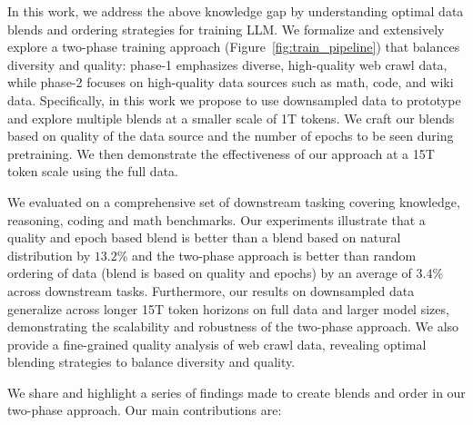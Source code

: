 \documentclass[11pt]{article}
\newcommand{\gainRO}{$3.4$\%\xspace}
\newcommand{\gainROND}{$13.2$\%\xspace}
\begin{document}
In this work, we address the above knowledge gap by understanding optimal data blends and ordering strategies for training LLM. We formalize and extensively explore a two-phase training approach (Figure~\ref{fig:train_pipeline}) that balances diversity and quality: phase-1 emphasizes diverse, high-quality web crawl data, while phase-2 focuses on high-quality data sources such as math, code, and wiki data.
Specifically, in this work we propose to use downsampled data to prototype and explore multiple blends at a smaller scale of 1T tokens.
We craft our blends based on quality of the data source and the number of epochs to be seen during pretraining.
We then demonstrate the effectiveness of our approach at a 15T token scale using the full data.

We evaluated on a comprehensive set of downstream tasking covering knowledge, reasoning, coding and math benchmarks.
Our experiments illustrate that a quality and epoch based blend is better than a blend based on natural distribution by \gainROND and the two-phase approach is better than random ordering of data (blend is based on quality and epochs) by an average of \gainRO across downstream tasks.
Furthermore, our results on downsampled data generalize across longer 15T token horizons on full data and larger model sizes, demonstrating the scalability and robustness of the two-phase approach. 
We also provide a fine-grained quality analysis of web crawl data, revealing optimal blending strategies to balance diversity and quality. 

We share and highlight a series of findings made to create blends and order in our two-phase approach.
Our main contributions are:
\end{document}
